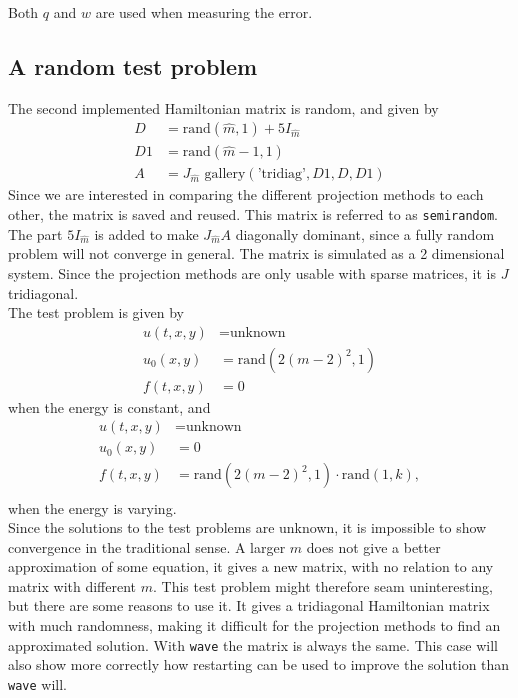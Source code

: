 \noindent Both $q$ and $w$ are used when measuring the error. \\

\subsection{A random test problem} %
The second implemented Hamiltonian matrix is random, and given by
\begin{equation*}
\begin{aligned}
D &= \text{rand}(\hat{m},1) + 5 I_{\hat{m}} \\
D1 & = \text{rand}(\hat{m}-1,1) \\
A &= J_{\hat{m}} \text{ gallery}(\text{'tridiag'},D1,D,D1)
\end{aligned}
\end{equation*}
Since we are interested in comparing the different projection methods to each other, the matrix is saved and reused. This matrix is referred to as \texttt{semirandom}. The part $5 I_{\hat{m}} $ is added to make $J_{\hat{m}}A$ diagonally dominant, since a fully random problem will not converge in general. The matrix is simulated as a 2 dimensional system. Since the projection methods are only usable with sparse matrices, it is $J$ tridiagonal.\\
The test problem is given by
\begin{equation*}
\begin{aligned}
u(t,x,y) &= \text{unknown} \\
u_0(x,y) &= \text{rand} (2 (m-2)^2,1) \\
f(t,x,y) &= 0
\end{aligned}
\end{equation*}
when the energy is constant, and 
\begin{equation*}
\begin{aligned}
u(t,x,y) &= \text{unknown} \\
u_0(x,y) &= 0 \\
f(t,x,y) &= \text{rand} (2 (m-2)^2,1) \cdot \text{rand}(1,k), \\
\end{aligned}
\end{equation*}
when the energy is varying.\\

\noindent Since the solutions to the test problems are unknown, it is impossible to show convergence in the traditional sense. A larger $m$ does not give a better approximation of some equation, it gives a new matrix, with no relation to any matrix with different $m$. This test problem might therefore seam uninteresting, but there are some reasons to use it. It gives a tridiagonal Hamiltonian matrix with much randomness, making it difficult for the projection methods to find an approximated solution. With \texttt{wave} the matrix is always the same. This case will also show more correctly how restarting can be used to improve the solution than \texttt{wave} will.  \\

